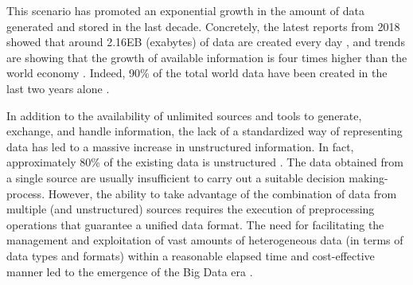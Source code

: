 This scenario has promoted an exponential growth in the amount of data generated and stored in the last decade. Concretely, the latest reports from 2018 showed that around 2.16EB (exabytes) of data are created every day \citep{D5, D6}, and trends are showing that the growth of available information is four times higher than the world economy \citep{D6}. Indeed, 90\% of the total world data have been created in the last two years alone \citep{D7}. 

In addition to the availability of unlimited sources and tools to generate, exchange, and handle information, the lack of a standardized way of representing data has led to a massive increase in unstructured information. In fact, approximately 80\% of the existing data is unstructured \citep{D6, D7}. The data obtained from a single source are usually insufficient to carry out a suitable decision making-process. However, the ability to take advantage of the combination of data from multiple (and unstructured) sources requires the execution of preprocessing operations that guarantee a unified data format. The need for facilitating the management and exploitation of vast amounts of heterogeneous data (in terms of data types and formats) within a reasonable elapsed time and cost-effective manner led to the emergence of the Big Data era \citep{D8, D9}. 

